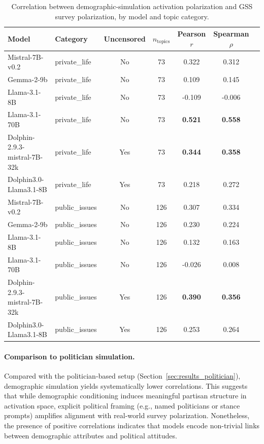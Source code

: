 \begin{table}[ht]
\centering
\small
\caption{Correlation between demographic-simulation activation polarization and GSS survey polarization, by model and topic category.}
\label{tab:demographic_results}
\begin{tabular}{llccccc}
\toprule
Model & Category & Uncensored & $n_{\text{topics}}$ & Pearson $r$ & Spearman $\rho$ \\
\midrule
Mistral-7B-v0.2        & private\_life  & No  & 73  & 0.322 & 0.312 \\
Gemma-2-9b             & private\_life  & No  & 73  & 0.109 & 0.145 \\
Llama-3.1-8B           & private\_life  & No  & 73  & -0.109 & -0.006 \\
Llama-3.1-70B          & private\_life  & No  & 73  & \textbf{0.521} & \textbf{0.558} \\
Dolphin-2.9.3-mistral-7B-32k & private\_life & Yes & 73  & \textbf{0.344} & \textbf{0.358} \\
Dolphin3.0-Llama3.1-8B & private\_life  & Yes & 73  & 0.218 & 0.272 \\
\midrule
Mistral-7B-v0.2        & public\_issues & No  & 126 & 0.307 & 0.334 \\
Gemma-2-9b             & public\_issues & No  & 126 & 0.230 & 0.224 \\
Llama-3.1-8B           & public\_issues & No  & 126 & 0.132 & 0.163 \\
Llama-3.1-70B    & public\_issues & No & 126  & -0.026 & 0.008 \\
Dolphin-2.9.3-mistral-7B-32k & public\_issues & Yes & 126 & \textbf{0.390} & \textbf{0.356} \\
Dolphin3.0-Llama3.1-8B & public\_issues & Yes & 126 & 0.253 & 0.264 \\
\bottomrule
\end{tabular}
\end{table}

\paragraph{Comparison to politician simulation.}
Compared with the politician-based setup (Section~\ref{sec:results_politician}), demographic simulation yields systematically lower correlations. This suggests that while demographic conditioning induces meaningful partisan structure in activation space, explicit political framing (e.g., named politicians or stance prompts) amplifies alignment with real-world survey polarization. Nonetheless, the presence of positive correlations indicates that models encode non-trivial links between demographic attributes and political attitudes.

